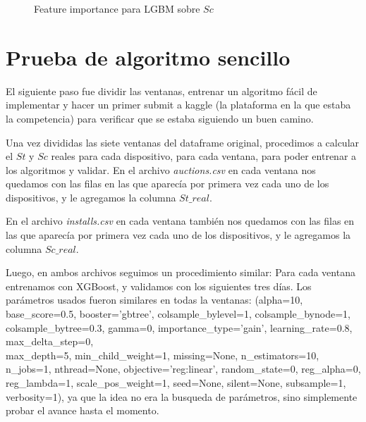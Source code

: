 \documentclass[a4paper, 12pt]{article}
\begin{document}
\begin{figure}[H]
    \centering
    \caption{Feature importance para LGBM sobre $Sc$}
\end{figure}

\newpage
\section{Prueba de algoritmo sencillo}
El siguiente paso fue dividir las ventanas, entrenar un algoritmo fácil de implementar y hacer un primer submit a kaggle (la plataforma en la que estaba la competencia) para verificar que se estaba siguiendo un buen camino.

Una vez divididas las siete ventanas del dataframe original, procedimos a calcular el $St$ y $Sc$ reales para cada dispositivo, para cada ventana, para poder entrenar a los algoritmos y validar. 
En el archivo \textit{auctions.csv} en cada ventana nos quedamos con las filas en las que aparecía por primera vez cada uno de los dispositivos, y le agregamos la columna $St\_real$.

En el archivo \textit{installs.csv} en cada ventana también nos quedamos con las filas en las que aparecía por primera vez cada uno de los dispositivos, y le agregamos la columna $Sc\_real$.

Luego, en ambos archivos seguimos un procedimiento similar: Para cada ventana entrenamos con XGBoost, y validamos con los siguientes tres días. Los parámetros usados fueron similares en todas la ventanas: 
(alpha=10, base\_score=0.5, booster='gbtree', colsample\_bylevel=1, colsample\_bynode=1, colsample\_bytree=0.3, gamma=0, importance\_type='gain', learning\_rate=0.8, max\_delta\_step=0, \\max\_depth=5, min\_child\_weight=1, missing=None, n\_estimators=10, n\_jobs=1, nthread=None, objective='reg:linear', random\_state=0, reg\_alpha=0, reg\_lambda=1, scale\_pos\_weight=1, seed=None, silent=None, subsample=1, verbosity=1), ya que la idea no era la busqueda de parámetros, sino simplemente probar el avance hasta el momento.
\end{document}
